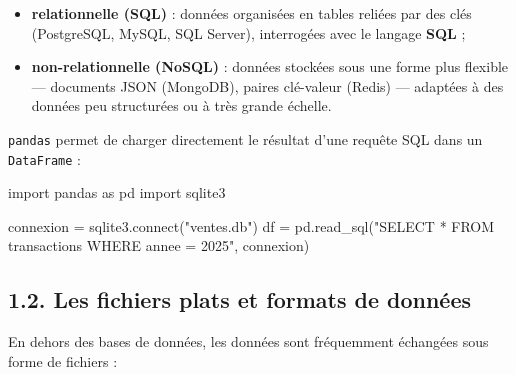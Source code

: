 \documentclass[
  french,
  letterpaper,
  open=any]{scrbook}
\newenvironment{Shaded}{\begin{snugshade}}{\end{snugshade}}
\newcommand{\ExtensionTok}[1]{\textcolor[rgb]{0.00,0.23,0.31}{#1}}
\newcommand{\ImportTok}[1]{\textcolor[rgb]{0.00,0.46,0.62}{#1}}
\newcommand{\NormalTok}[1]{\textcolor[rgb]{0.00,0.23,0.31}{#1}}
\newcommand{\OperatorTok}[1]{\textcolor[rgb]{0.37,0.37,0.37}{#1}}
\newcommand{\StringTok}[1]{\textcolor[rgb]{0.13,0.47,0.30}{#1}}
\providecommand{\tightlist}{%
  \setlength{\itemsep}{0pt}\setlength{\parskip}{0pt}}
\theoremstyle{definition}
\theoremstyle{definition}
\theoremstyle{remark}
\begin{document}
\begin{itemize}
\tightlist
\item
  \textbf{relationnelle (SQL)} : données organisées en tables reliées
  par des clés (PostgreSQL, MySQL, SQL Server), interrogées avec le
  langage \textbf{SQL} ;
\item
  \textbf{non-relationnelle (NoSQL)} : données stockées sous une forme
  plus flexible --- documents JSON (MongoDB), paires clé-valeur (Redis)
  --- adaptées à des données peu structurées ou à très grande échelle.
\end{itemize}

\texttt{pandas} permet de charger directement le résultat d'une requête
SQL dans un \texttt{DataFrame} :

\begin{Shaded}
\begin{Highlighting}[]
\ImportTok{import}\NormalTok{ pandas }\ImportTok{as}\NormalTok{ pd}
\ImportTok{import}\NormalTok{ sqlite3}

\NormalTok{connexion }\OperatorTok{=}\NormalTok{ sqlite3.}\ExtensionTok{connect}\NormalTok{(}\StringTok{"ventes.db"}\NormalTok{)}
\NormalTok{df }\OperatorTok{=}\NormalTok{ pd.read\_sql(}\StringTok{"SELECT * FROM transactions WHERE annee = 2025"}\NormalTok{, connexion)}
\end{Highlighting}
\end{Shaded}

\subsection{1.2. Les fichiers plats et formats de
données}\label{les-fichiers-plats-et-formats-de-donnuxe9es}

En dehors des bases de données, les données sont fréquemment échangées
sous forme de fichiers :
\end{document}
